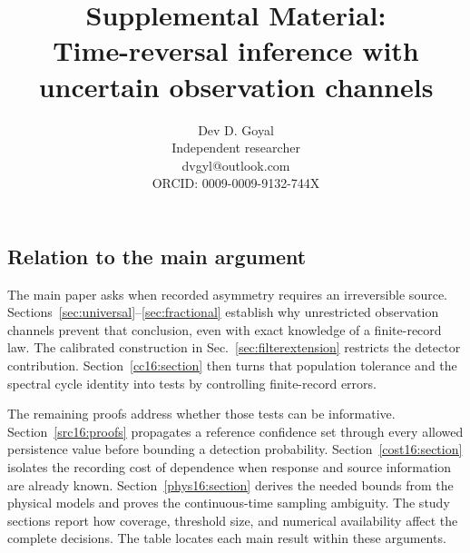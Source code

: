 \documentclass[11pt]{article}
\title{Supplemental Material:\\Time-reversal inference with uncertain observation channels}
\author{Dev D. Goyal\\Independent researcher\\\textnormal{dvgyl@outlook.com}\\ORCID: 0009-0009-9132-744X}\date{}
\begin{document}
\maketitle
\makeatletter
\renewcommand*\l@section{\@dottedtocline{1}{0em}{2.2em}}
\renewcommand*\l@subsection{\@dottedtocline{2}{1.5em}{3.8em}}
\makeatother
\tableofcontents

\subsection*{Relation to the main argument}
The main paper asks when recorded asymmetry requires an irreversible source. Sections~\ref{sec:universal}--\ref{sec:fractional} establish why unrestricted observation channels prevent that conclusion, even with exact knowledge of a finite-record law. The calibrated construction in Sec.~\ref{sec:filterextension} restricts the detector contribution. Section~\ref{cc16:section} then turns that population tolerance and the spectral cycle identity into tests by controlling finite-record errors.

The remaining proofs address whether those tests can be informative. Section~\ref{src16:proofs} propagates a reference confidence set through every allowed persistence value before bounding a detection probability. Section~\ref{cost16:section} isolates the recording cost of dependence when response and source information are already known. Section~\ref{phys16:section} derives the needed bounds from the physical models and proves the continuous-time sampling ambiguity. The study sections report how coverage, threshold size, and numerical availability affect the complete decisions. The table locates each main result within these arguments.
\end{document}
